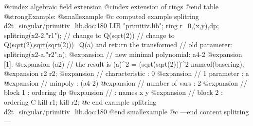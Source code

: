 @cindex algebraic field extension
@cindex extension of rings
@end table
@strong{Example:}
@smallexample
@c computed example splitring d2t_singular/primitiv_lib.doc:180 
LIB "primitiv.lib";
ring r=0,(x,y),dp;
splitring(x2-2,"r1");   // change to Q(sqrt(2))
// change to Q(sqrt(2),sqrt(sqrt(2)))=Q(a) and return the transformed 
// old parameter:
splitring(x2-a,"r2",a); 
@expansion{} // new minimal polynomial: a4-2
@expansion{} [1]:
@expansion{}    (a2)
// the result is (a)^2 = (sqrt(sqrt(2)))^2
nameof(basering);
@expansion{} r2
r2;
@expansion{} //   characteristic : 0
@expansion{} //   1 parameter    : a 
@expansion{} //   minpoly        : (a4-2)
@expansion{} //   number of vars : 2
@expansion{} //        block   1 : ordering dp
@expansion{} //                  : names    x y 
@expansion{} //        block   2 : ordering C
kill r1; kill r2;
@c end example splitring d2t_singular/primitiv_lib.doc:180
@end smallexample
@c ---end content splitring---
